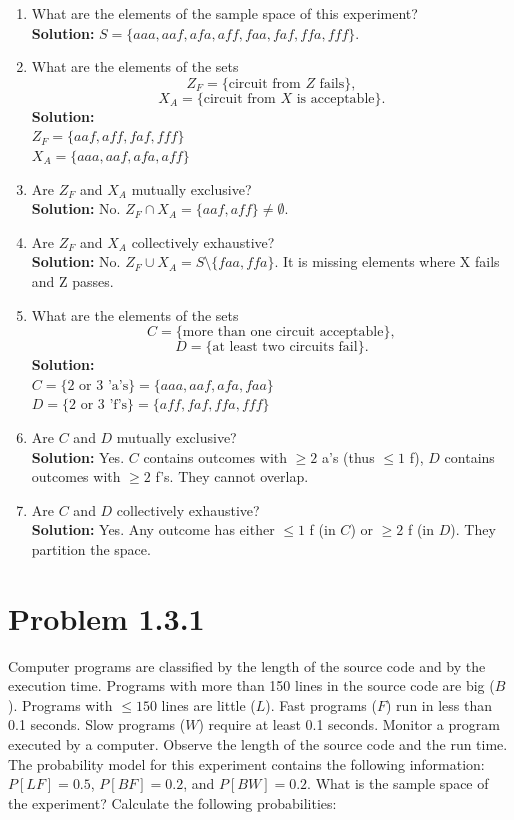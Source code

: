 \documentclass{article}
\begin{document}
\begin{enumerate}[label=(\alph*)]
    \item What are the elements of the sample space of this experiment? \\
    \textbf{Solution:} $S = \{aaa, aaf, afa, aff, faa, faf, ffa, fff\}$.
    \item What are the elements of the sets
    \[ Z_F = \{ \text{circuit from } Z \text{ fails} \}, \]
    \[ X_A = \{ \text{circuit from } X \text{ is acceptable} \}. \]
    \textbf{Solution:} \\
    $Z_F = \{aaf, aff, faf, fff\}$ \\
    $X_A = \{aaa, aaf, afa, aff\}$
    \item Are $Z_F$ and $X_A$ mutually exclusive? \\
    \textbf{Solution:} No. $Z_F \cap X_A = \{aaf, aff\} \neq \emptyset$.
    \item Are $Z_F$ and $X_A$ collectively exhaustive? \\
    \textbf{Solution:} No. $Z_F \cup X_A = S \setminus \{faa, ffa\}$. It is missing elements where X fails and Z passes.
    \item What are the elements of the sets
    \[ C = \{ \text{more than one circuit acceptable} \}, \]
    \[ D = \{ \text{at least two circuits fail} \}. \]
    \textbf{Solution:} \\
    $C = \{ \text{2 or 3 'a's} \} = \{aaa, aaf, afa, faa\}$ \\
    $D = \{ \text{2 or 3 'f's} \} = \{aff, faf, ffa, fff\}$
    \item Are $C$ and $D$ mutually exclusive? \\
    \textbf{Solution:} Yes. $C$ contains outcomes with $\ge 2$ a's (thus $\le 1$ f), $D$ contains outcomes with $\ge 2$ f's. They cannot overlap.
    \item Are $C$ and $D$ collectively exhaustive? \\
    \textbf{Solution:} Yes. Any outcome has either $\le 1$ f (in $C$) or $\ge 2$ f (in $D$). They partition the space.
\end{enumerate}

\newpage

\section*{Problem 1.3.1}
Computer programs are classified by the length of the source code and by the execution time. Programs with more than 150 lines in the source code are big ($B$). Programs with $\le 150$ lines are little ($L$). Fast programs ($F$) run in less than 0.1 seconds. Slow programs ($W$) require at least 0.1 seconds. Monitor a program executed by a computer. Observe the length of the source code and the run time. The probability model for this experiment contains the following information: $P[LF] = 0.5$, $P[BF] = 0.2$, and $P[BW] = 0.2$. What is the sample space of the experiment? Calculate the following probabilities:
\end{document}
